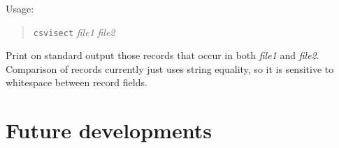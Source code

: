 \documentclass[12pt,fleqn]{article}
\begin{document}
Usage:
\begin{quote}
  \texttt{csvisect} \textit{file1} \textit{file2}
\end{quote}
Print on standard output those records that occur in both
\textit{file1} and \textit{file2}.  Comparison of records currently
just uses string equality, so it is sensitive to whitespace between
record fields. 





\section{Future developments}
\end{document}
